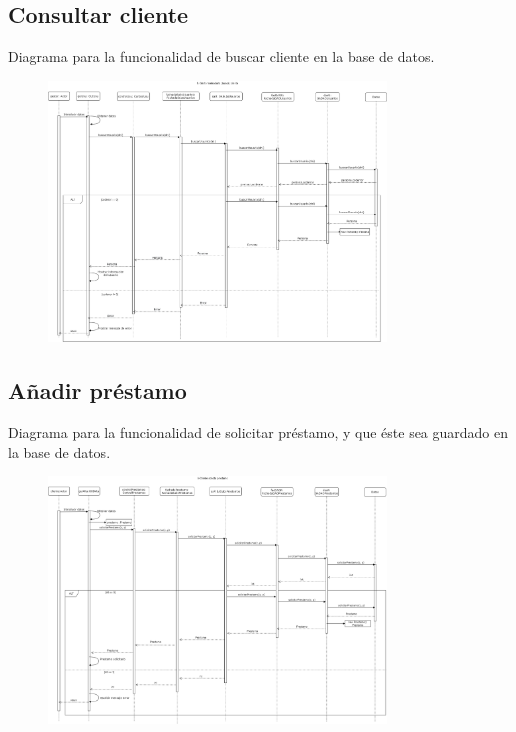 \documentclass[12pt]{article}
\begin{document}
\subsection{Consultar cliente}
Diagrama para la funcionalidad de buscar cliente en la base de datos.
\begin{figure}[H]
    \centering
    \includegraphics[width=0.8\textwidth]{images/gestor_selecciona_cliente_consultar_5.png}
\end{figure}
\subsection{Añadir préstamo}
Diagrama para la funcionalidad de solicitar préstamo, y que éste sea guardado en la base de datos.
\begin{figure}[H]
    \centering
    \includegraphics[width=0.8\textwidth]{images/ClienteSolicitaPrestamo2.png}
\end{figure}
\newpage
\end{document}
